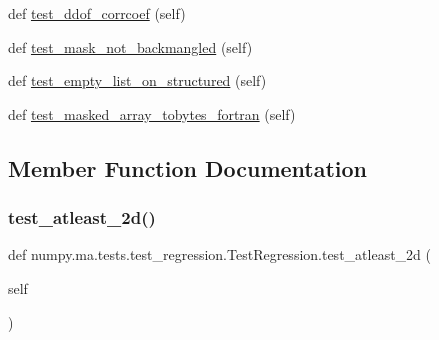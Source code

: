 \begin{DoxyCompactItemize}
\item 
def \hyperlink{classnumpy_1_1ma_1_1tests_1_1test__regression_1_1TestRegression_af3f06ec998ab9e0959438f4917cecd1e}{test\+\_\+ddof\+\_\+corrcoef} (self)
\item 
def \hyperlink{classnumpy_1_1ma_1_1tests_1_1test__regression_1_1TestRegression_aa6b39a591e3e42d423f1bb57d25eaf76}{test\+\_\+mask\+\_\+not\+\_\+backmangled} (self)
\item 
def \hyperlink{classnumpy_1_1ma_1_1tests_1_1test__regression_1_1TestRegression_ae901bd1249a304734cb6526c99ee2a63}{test\+\_\+empty\+\_\+list\+\_\+on\+\_\+structured} (self)
\item 
def \hyperlink{classnumpy_1_1ma_1_1tests_1_1test__regression_1_1TestRegression_a18a887d066a8d0fbf3a88dc5feb8c90b}{test\+\_\+masked\+\_\+array\+\_\+tobytes\+\_\+fortran} (self)
\end{DoxyCompactItemize}


\subsection{Member Function Documentation}
\mbox{\label{classnumpy_1_1ma_1_1tests_1_1test__regression_1_1TestRegression_a0d64341bbb22ba686bdfeabbb3262f89}} 
\subsubsection{\texorpdfstring{test\+\_\+atleast\+\_\+2d()}{test\_atleast\_2d()}}
{\footnotesize\ttfamily def numpy.\+ma.\+tests.\+test\+\_\+regression.\+Test\+Regression.\+test\+\_\+atleast\+\_\+2d (\begin{DoxyParamCaption}\item[{}]{self }\end{DoxyParamCaption})}

\mbox{\label{classnumpy_1_1ma_1_1tests_1_1test__regression_1_1TestRegression_af3f06ec998ab9e0959438f4917cecd1e}} 
